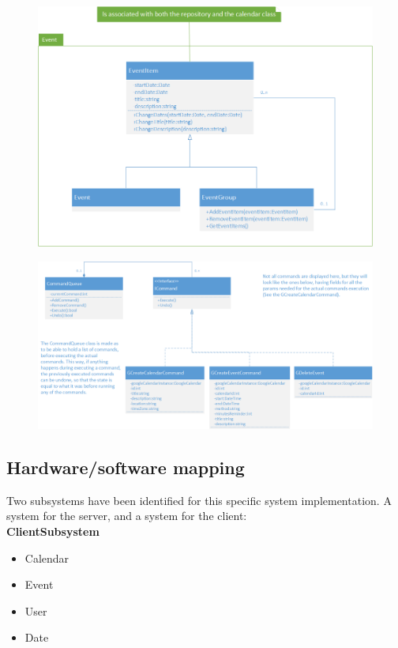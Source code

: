 \documentclass[10pt]{report}
\numberwithin{equation}{section} %
\numberwithin{figure}{section} %
\numberwithin{table}{section} %
\begin{document}
\begin{figure}[H]
  \includegraphics[scale=0.40]{figures/composite.png}
\end{figure}

\begin{figure}[H]
  \includegraphics[scale=0.40]{figures/command.png}
\end{figure}

\subsection{Hardware/software mapping}
Two subsystems have been identified for this specific system implementation. A
system for the server, and a system for the client:\\
\textbf{ClientSubsystem}
\begin{itemize}
\item Calendar
\item Event
\item User
\item Date
\end{itemize}
\end{document}
